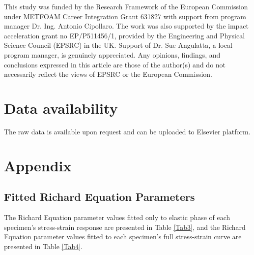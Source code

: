 \documentclass[review]{elsarticle}
\begin{document}
{This study was funded by the Research Framework of the European Commission under METFOAM Career Integration Grant 631827 with support from program manager Dr. Ing. Antonio Cipollaro. The work was also supported by the impact acceleration grant no EP/P511456/1, provided by the Engineering and Physical Science Council (EPSRC) in the UK. Support of Dr. Sue Angulatta, a local program manager, is genuinely appreciated. Any opinions, findings, and conclusions expressed in this article are those of the author(s) and do not necessarily reflect the views of EPSRC or the European Commission. 


\section*{Data availability}

The raw data is available upon request and can be uploaded to Elsevier platform.



\section*{Appendix}

\subsection*{Fitted Richard Equation Parameters}

The Richard Equation parameter values fitted only to elastic phase of each specimen’s stress-strain response are presented in Table \ref{Tab3}, and the Richard Equation parameter values fitted to each specimen’s full stress-strain curve are presented in Table \ref{Tab4}.

\begin{landscape}



\end{landscape}}
\end{document}
